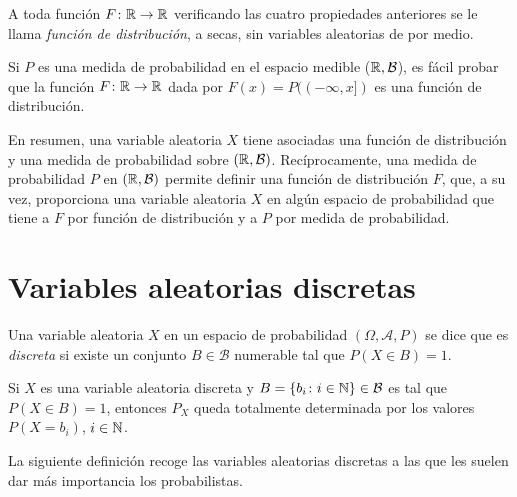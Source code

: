\documentclass[a4paper, 11pt, extrafontsizes]{memoir}
\begin{document}
A toda función $F \colon \mathbb R \to \mathbb R$ verificando las cuatro propiedades anteriores se le llama \emph{función de distribución}, a secas, sin variables aleatorias de por medio.

Si $P$ es una medida de probabilidad en el espacio medible ($\mathbb R,\mathcal{B}$), es fácil probar que la función $F \colon \mathbb R \to \mathbb R$ dada por $F(x) = P((-\infty,x])$ es una función de distribución.

En resumen, una variable aleatoria $X$ tiene asociadas una función de distribución y una medida de probabilidad sobre $(\mathbb R,\mathcal{B})$. Recíprocamente, una medida de probabilidad $P$ en $(\mathbb R,\mathcal{B})$ permite definir una función de distribución $F$, que, a su vez, proporciona una variable aleatoria $X$ en algún espacio de probabilidad que tiene a $F$ por función de distribución y a $P$ por medida de probabilidad.

\section{Variables aleatorias discretas}

\begin{definition}
    Una variable aleatoria $X$ en un espacio de probabilidad $(\Omega,\mathcal{A},P)$ se dice que es \emph{discreta} si existe un conjunto $B \in \mathcal{B}$ numerable tal que $P(X \in B) = 1$.
\end{definition}

Si $X$ es una variable aleatoria discreta y $B = \{b_i \colon i \in \mathbb N\} \in \mathcal{B}$ es tal que $P(X \in B)= 1$, entonces $P_X$ queda totalmente determinada por los valores $P(X = b_i)$, $i \in \mathbb N$.

La siguiente definición recoge las variables aleatorias discretas a las que les suelen dar más importancia los probabilistas. 
\end{document}

